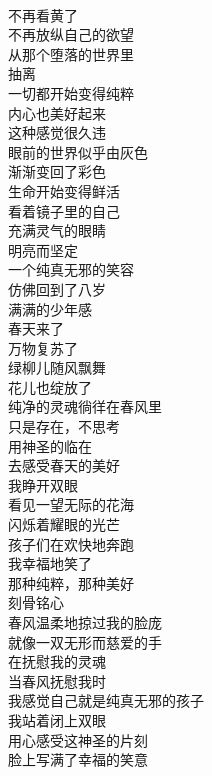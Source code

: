 \begin{poem}[春风里的戒者]
    \begin{multicols}{3}
        \begin{center}~\\
            不再看黄了 \\ 不再放纵自己的欲望 \\ 从那个堕落的世界里 \\ 抽离 \\ 一切都开始变得纯粹 \\ 内心也美好起来 \\ 这种感觉很久违 \\ 眼前的世界似乎由灰色 \\ 渐渐变回了彩色 \\ 生命开始变得鲜活 \\ 看着镜子里的自己 \\ 充满灵气的眼睛 \\ 明亮而坚定 \\ 一个纯真无邪的笑容 \\ 仿佛回到了八岁 \\ 满满的少年感 \\ 春天来了 \\ 万物复苏了 \\ 绿柳儿随风飘舞 \\ 花儿也绽放了 \\ 纯净的灵魂徜徉在春风里 \\ 只是存在，不思考 \\ 用神圣的临在 \\ 去感受春天的美好 \\ 我睁开双眼 \\ 看见一望无际的花海 \\ 闪烁着耀眼的光芒 \\ 孩子们在欢快地奔跑 \\ 我幸福地笑了 \\ 那种纯粹，那种美好 \\ 刻骨铭心 \\ 春风温柔地掠过我的脸庞 \\ 就像一双无形而慈爱的手 \\ 在抚慰我的灵魂 \\ 当春风抚慰我时 \\ 我感觉自己就是纯真无邪的孩子 \\ 我站着闭上双眼 \\ 用心感受这神圣的片刻 \\ 脸上写满了幸福的笑意
        \end{center}
    \end{multicols}
\end{poem}

